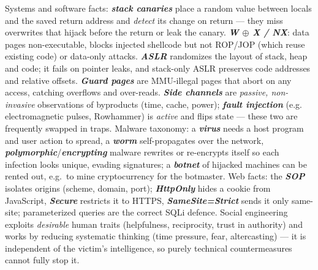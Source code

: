 \documentclass[12pt, a4paper]{article}
\newcommand{\term}[1]{\textbf{\textit{#1}}}        %
\begin{document}
Systems and software facts: \term{stack canaries} place a random value between locals and the saved return address and \emph{detect} its change on return --- they miss overwrites that hijack before the return or leak the canary. \term{W $\oplus$ X / NX}: data pages non-executable, blocks injected shellcode but not ROP/JOP (which reuse existing code) or data-only attacks. \term{ASLR} randomizes the layout of stack, heap and code; it fails on pointer leaks, and stack-only ASLR preserves code addresses and relative offsets. \term{Guard pages} are MMU-illegal pages that abort on any access, catching overflows and over-reads. \term{Side channels} are \emph{passive, non-invasive} observations of byproducts (time, cache, power); \term{fault injection} (e.g. electromagnetic pulses, Rowhammer) is \emph{active} and flips state --- these two are frequently swapped in traps. Malware taxonomy: a \term{virus} needs a host program and user action to spread, a \term{worm} self-propagates over the network, \term{polymorphic}/\term{encrypting} malware rewrites or re-encrypts itself so each infection looks unique, evading signatures; a \term{botnet} of hijacked machines can be rented out, e.g.\ to mine cryptocurrency for the botmaster. Web facts: the \term{SOP} isolates origins (scheme, domain, port); \term{HttpOnly} hides a cookie from JavaScript, \term{Secure} restricts it to HTTPS, \term{SameSite=Strict} sends it only same-site; parameterized queries are the correct SQLi defence. Social engineering exploits \emph{desirable} human traits (helpfulness, reciprocity, trust in authority) and works by reducing systematic thinking (time pressure, fear, altercasting) --- it is independent of the victim's intelligence, so purely technical countermeasures cannot fully stop it.
\end{document}
